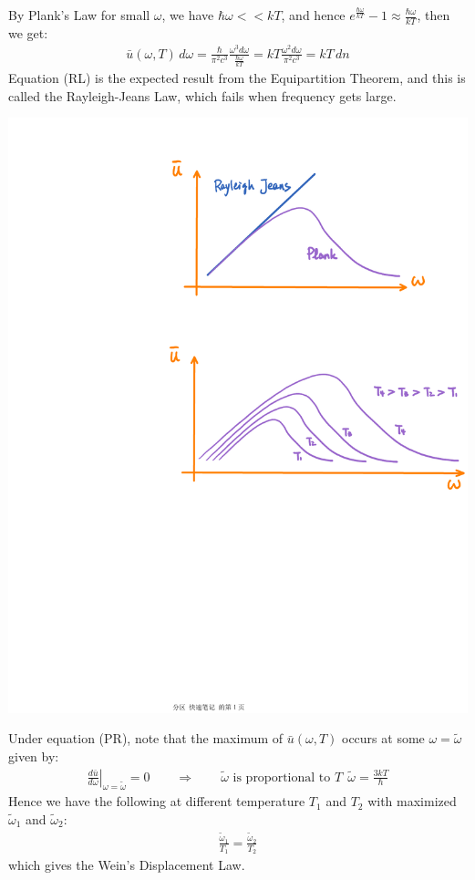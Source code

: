 \documentclass[11pt,oneside]{book}
\theoremstyle{break}
\theoremstyle{break}
\newcommand{\that}[1]{\widetilde{#1}}
\begin{document}
By Plank's Law for small $\omega$, we have $\hbar \omega << kT$, and hence $e^{\frac{\hbar \omega}{kT}}-1 \approx \frac{\hbar \omega}{kT}$, then we get:
\begin{align*}
\bar{u}(\omega, T ) \, d\omega = \frac{\hbar}{\pi^2 c^3} \frac{\omega^3 d\omega}{\frac{\hbar \omega}{kT}} = kT \frac{\omega^2 d\omega}{\pi^2 c^3} = kT \, dn \tag{RL}
\end{align*}
Equation (RL) is the expected result from the Equipartition Theorem, and this is called the Rayleigh-Jeans Law, which fails when frequency gets large.\\
\begin{center}
\includegraphics[scale=0.69]{RJ.pdf}
\end{center}

\newpage
Under equation (PR), note that the maximum of $\bar{u}(\omega, T)$ occurs at some $\omega = \that{\omega}$ given by:
\begin{align*}
\left. \frac{d\bar{u}}{d\omega}\right|_{\omega = \that{\omega}} = 0 \qquad \Rightarrow \qquad \that{\omega}\text{ is proportional to }T \ \ \that{\omega} = \frac{3kT}{\hbar}
\end{align*}
Hence we have the following at different temperature $T_1$ and $T_2$ with maximized $\that{\omega}_1$ and $\that{\omega}_2$:
\begin{align*}
\frac{\that{\omega}_1}{T_1} = \frac{\that{\omega}_2}{T_2}
\end{align*}
which gives the Wein's Displacement Law. \\
\end{document}

